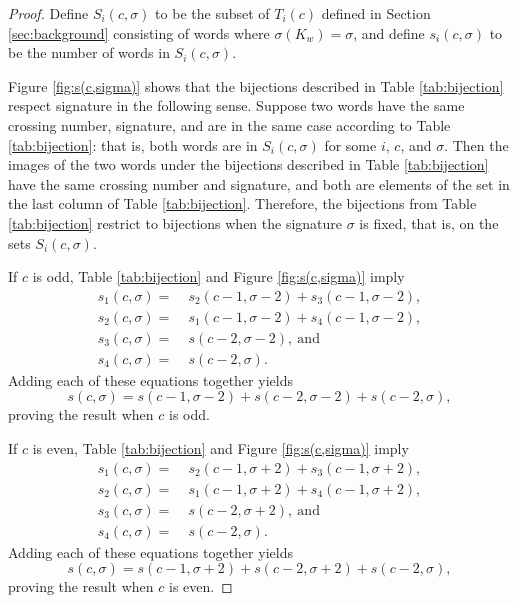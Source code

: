 \documentclass[12pt]{amsart}
\theoremstyle{definition}
\theoremstyle{remark}
\numberwithin{equation}{section}
\begin{document}
\begin{proof}
Define $S_i(c,\sigma)$ to be the subset of $T_i(c)$ defined in Section \ref{sec:background} consisting of words where $\sigma(K_w)=\sigma$, and define $s_i(c,\sigma)$ to be the number of words in $S_i(c,\sigma)$. 

 Figure \ref{fig:s(c,sigma)} shows that the bijections described in Table \ref{tab:bijection} respect signature in the following sense. Suppose two words have the same crossing number, signature, and are in the same case according to Table \ref{tab:bijection}: that is, both words are in $S_i(c,\sigma)$ for some $i$, $c$, and $\sigma$. Then the images of the two words under the bijections described in Table \ref{tab:bijection} have the same crossing number and signature, and both are elements of the set in the last column of Table \ref{tab:bijection}. Therefore, the bijections from Table \ref{tab:bijection} restrict to bijections when the signature $\sigma$ is fixed, that is, on the sets $S_i(c,\sigma)$.


If $c$ is  odd, Table \ref{tab:bijection} and Figure \ref{fig:s(c,sigma)} imply 
\begin{align*}
    s_1(c,\sigma) = & \; s_2(c-1,\sigma-2) + s_3(c-1,\sigma-2),\\
    s_2(c,\sigma) = & \; s_1(c-1,\sigma-2) + s_4(c-1,\sigma-2),\\
    s_3(c,\sigma) = & \; s(c-2,\sigma-2),~\text{and}\\
    s_4(c,\sigma) = & \; s(c-2,\sigma).
\end{align*}
Adding each of these equations together yields
\[s(c,\sigma) = s(c-1,\sigma-2) + s(c-2,\sigma-2)+s(c-2,\sigma),\]
proving the result when $c$ is  odd.


If $c$ is even, Table \ref{tab:bijection} and Figure \ref{fig:s(c,sigma)} imply
\begin{align*}
    s_1(c,\sigma) = & \; s_2(c-1,\sigma+2) + s_3(c-1,\sigma+2),\\
    s_2(c,\sigma) = & \; s_1(c-1,\sigma+2) + s_4(c-1,\sigma+2),\\
    s_3(c,\sigma) = & \; s(c-2,\sigma+2),~\text{and}\\
    s_4(c,\sigma) = & \; s(c-2,\sigma).
\end{align*}
Adding each of these equations together yields
\[s(c,\sigma) = s(c-1,\sigma+2) + s(c-2,\sigma+2)+s(c-2,\sigma),\]
proving the result when $c$ is even.
\end{proof}
\end{document}
